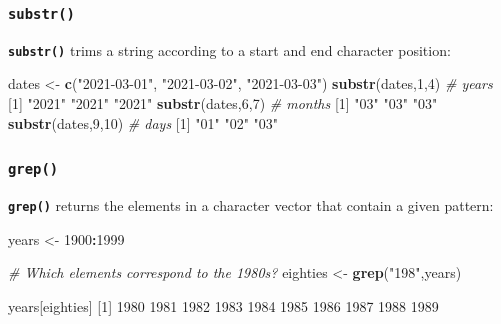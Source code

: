 \documentclass[]{book}
\newenvironment{Shaded}{\begin{snugshade}}{\end{snugshade}}
\newcommand{\CommentTok}[1]{\textcolor[rgb]{0.56,0.35,0.01}{\textit{#1}}}
\newcommand{\DecValTok}[1]{\textcolor[rgb]{0.00,0.00,0.81}{#1}}
\newcommand{\KeywordTok}[1]{\textcolor[rgb]{0.13,0.29,0.53}{\textbf{#1}}}
\newcommand{\NormalTok}[1]{#1}
\newcommand{\OperatorTok}[1]{\textcolor[rgb]{0.81,0.36,0.00}{\textbf{#1}}}
\newcommand{\StringTok}[1]{\textcolor[rgb]{0.31,0.60,0.02}{#1}}
\begin{document}
\hypertarget{substr}{%
\subsubsection*{\texorpdfstring{\texttt{substr()}}{substr()}}\label{substr}}

\textbf{\texttt{substr()}} trims a string according to a start and end character position:

\begin{Shaded}
\begin{Highlighting}[]
\NormalTok{dates <-}\StringTok{ }\KeywordTok{c}\NormalTok{(}\StringTok{"2021-03-01"}\NormalTok{,}
           \StringTok{"2021-03-02"}\NormalTok{,}
           \StringTok{"2021-03-03"}\NormalTok{)}
\KeywordTok{substr}\NormalTok{(dates,}\DecValTok{1}\NormalTok{,}\DecValTok{4}\NormalTok{) }\CommentTok{# years}
\NormalTok{[}\DecValTok{1}\NormalTok{] }\StringTok{"2021"} \StringTok{"2021"} \StringTok{"2021"}
\KeywordTok{substr}\NormalTok{(dates,}\DecValTok{6}\NormalTok{,}\DecValTok{7}\NormalTok{) }\CommentTok{# months}
\NormalTok{[}\DecValTok{1}\NormalTok{] }\StringTok{"03"} \StringTok{"03"} \StringTok{"03"}
\KeywordTok{substr}\NormalTok{(dates,}\DecValTok{9}\NormalTok{,}\DecValTok{10}\NormalTok{) }\CommentTok{# days}
\NormalTok{[}\DecValTok{1}\NormalTok{] }\StringTok{"01"} \StringTok{"02"} \StringTok{"03"}
\end{Highlighting}
\end{Shaded}

\hypertarget{grep}{%
\subsubsection*{\texorpdfstring{\texttt{grep()}}{grep()}}\label{grep}}

\textbf{\texttt{grep()}} returns the elements in a character vector that contain a given pattern:

\begin{Shaded}
\begin{Highlighting}[]
\NormalTok{years <-}\StringTok{ }\DecValTok{1900}\OperatorTok{:}\DecValTok{1999}

\CommentTok{# Which elements correspond to the 1980s?}
\NormalTok{eighties <-}\StringTok{ }\KeywordTok{grep}\NormalTok{(}\StringTok{"198"}\NormalTok{,years)}

\NormalTok{years[eighties]}
\NormalTok{ [}\DecValTok{1}\NormalTok{] }\DecValTok{1980} \DecValTok{1981} \DecValTok{1982} \DecValTok{1983} \DecValTok{1984} \DecValTok{1985} \DecValTok{1986} \DecValTok{1987} \DecValTok{1988} \DecValTok{1989}
\end{Highlighting}
\end{Shaded}
\end{document}
